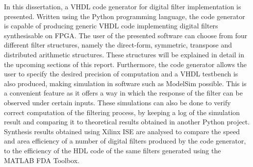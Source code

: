 \documentclass{csfyp}
\begin{document}
In this dissertation, a VHDL code generator for digital filter implementation is presented. Written using the Python programming language, the code generator is capable of producing generic VHDL code implementing digital filters synthesisable on FPGA. The user of the presented software can choose from four different filter structures, namely the direct-form, symmetric, transpose and distributed arithmetic structures. These structures will be explained in detail in the upcoming sections of this report. Furthermore, the code generator allows the user to specify the desired precision of computation and a VHDL testbench is also produced, making simulation in software such as ModelSim possible. This is a convenient feature as it offers a way in which the response of the filter can be observed under certain inputs. These simulations can also be done to verify correct computation of the filtering process, by keeping a log of the simulation result and comparing it to theoretical results obtained in another Python project.  Synthesis results obtained using Xilinx ISE are analysed to compare the speed and area efficiency of a number of digital filters produced by the code generator, to the efficiency of the HDL code of the same filters generated using the MATLAB FDA Toolbox.

\nocite{*}


\end{document}
